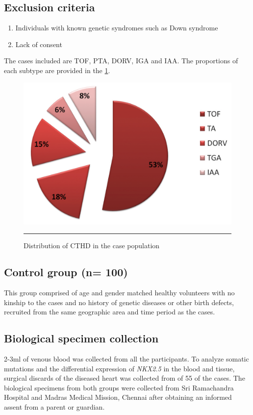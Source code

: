 \begin{refsection}
\subsection{Exclusion criteria}
\begin{enumerate}
\item Individuals with known genetic syndromes such as Down syndrome
\item Lack of consent
\end{enumerate}
	
The cases included are TOF, PTA, DORV, IGA and IAA.  The proportions of each subtype are provided in the \cref{fig:2_1casepopln}.

\begin{figure}[!b]
\centering
\includegraphics[scale=0.25,keepaspectratio]{Figures/2_1casepopln.pdf} 
\rule{35em}{0.5pt}
\caption[Distribution of CTHD in the case population]{Distribution of CTHD in the case population}
\label{fig:2_1casepopln}
\end{figure}

\subsection{Control group (n= 100)}
This group comprised of age and gender matched healthy volunteers with no kinship to the cases and no history of genetic diseases or other birth defects, recruited from the same geographic area and time period as the cases. 


\subsection{Biological specimen collection}
2-3ml of venous blood was collected from all the participants. To analyze somatic mutations and the differential expression of \textit{NKX2.5} in the blood and tissue, surgical discards of the diseased heart was collected from of 55 of the cases. The biological specimens from both groups were collected from Sri Ramachandra Hospital and Madras Medical Mission, Chennai after obtaining an informed assent from a parent or guardian. 


\end{refsection}

